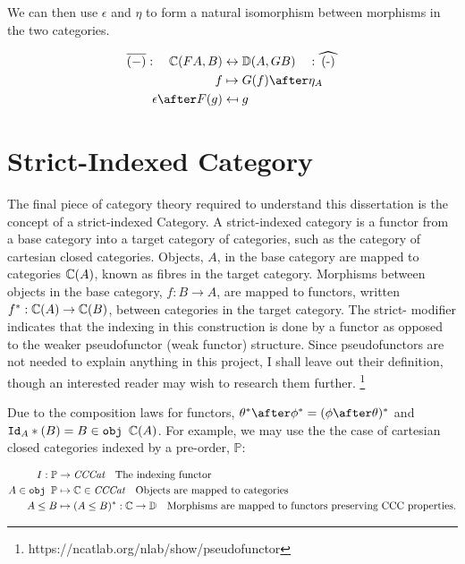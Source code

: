 \documentclass{Report}
\begin{document}
We can then use $\epsilon$ and $\eta$ to form a natural isomorphism between morphisms in the two categories.

\begin{align}
    \bar{(-)}: \quad\C(FA, B) &\leftrightarrow \DC(A, GB) \quad: \widehat{(-)}\\
     f & \mapsto G(f)\after\eta_A \\
     \epsilon\after F(g) & \mapsfrom g\\
\end{align}

\section{Strict-Indexed Category}

The final piece of category theory required to understand this dissertation is the concept of a strict-indexed Category. A strict-indexed category is a functor from a base category into a target category of categories, such as the category of cartesian closed categories. Objects, $A$, in the base category are mapped to categories $\mathbb{C}(A)$, known as fibres in the target category. Morphisms between objects in the base category, $f: B\rightarrow A$, are mapped to functors, written $f^*: \mathbb{C}(A)\rightarrow \mathbb{C}(B)$, between categories in the target category. The strict- modifier indicates that the indexing in this construction is done by a functor as opposed to the weaker pseudofunctor (weak functor) structure. Since pseudofunctors are not needed to explain anything in this project, I shall leave out their definition, though an interested reader may wish to research them further. \footnote{https://ncatlab.org/nlab/show/pseudofunctor}


Due to the composition laws for functors, $\theta\star\after\phi\star = (\phi\after\theta)\star$ and $\texttt{Id}_{A}*(B) = B\in\texttt{obj } \mathbb{C}(A)$. For example, we may use the the case of cartesian closed categories indexed by a pre-order, $\mathbb{P}$:

\begin{align}
    I: \mathbb{P} & \rightarrow \textit{CCCat}\quad\text{The indexing functor} \\
    A \in\texttt{obj }\mathbb{P} & \mapsto \mathbb{C} \in\textit{CCCat}\quad\text{Objects are mapped to categories}\\
    A \leq B & \mapsto (A \leq B)^*: \mathbb{C} \rightarrow \mathbb{D}\quad\text{Morphisms are mapped to functors preserving CCC properties.}
\end{align}
\end{document}
